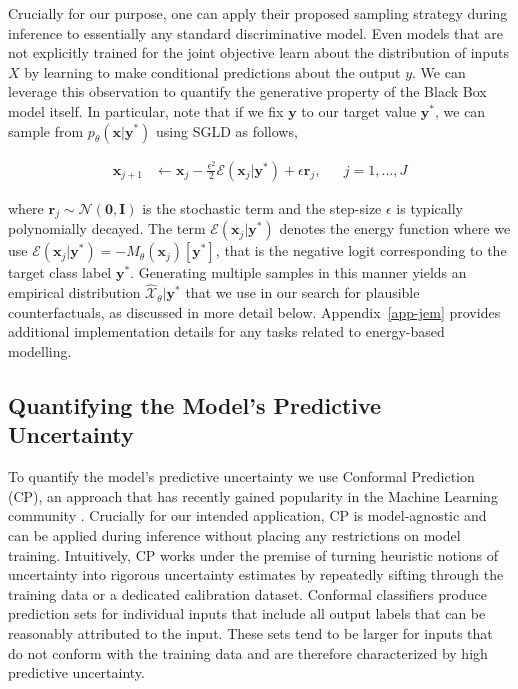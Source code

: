 \documentclass{article}
\begin{document}
Crucially for our purpose, one can apply their proposed sampling strategy during inference to essentially any standard discriminative model. Even models that are not explicitly trained for the joint objective learn about the distribution of inputs $X$ by learning to make conditional predictions about the output $y$. We can leverage this observation to quantify the generative property of the Black Box model itself. In particular, note that if we fix $\mathbf{y}$ to our target value $\mathbf{y}^*$, we can sample from $p_{\theta}(\mathbf{x}|\mathbf{y}^*)$ using SGLD as follows, 

\begin{equation}\label{eq:sgld}
  \begin{aligned}
    \mathbf{x}_{j+1} &\leftarrow \mathbf{x}_j - \frac{\epsilon^2}{2} \mathcal{E}(\mathbf{x}_j|\mathbf{y}^*) + \epsilon \mathbf{r}_j, && j=1,...,J
  \end{aligned}
\end{equation}

where $\mathbf{r}_j \sim \mathcal{N}(\mathbf{0},\mathbf{I})$ is the stochastic term and the step-size $\epsilon$ is typically polynomially decayed. The term $\mathcal{E}(\mathbf{x}_j|\mathbf{y}^*)$ denotes the energy function where we use $\mathcal{E}(\mathbf{x}_j|\mathbf{y}^*)=-M_{\theta}(\mathbf{x}_j)[\mathbf{y}^*]$, that is the negative logit corresponding to the target class label $\mathbf{y}^*$. Generating multiple samples in this manner yields an empirical distribution $\hat{\mathcal{X}}_{\theta}|\mathbf{y}^*$ that we use in our search for plausible counterfactuals, as discussed in more detail below. Appendix~\ref{app-jem} provides additional implementation details for any tasks related to energy-based modelling. 

\subsection{Quantifying the Model's Predictive Uncertainty}

To quantify the model's predictive uncertainty we use Conformal Prediction (CP), an approach that has recently gained popularity in the Machine Learning community \citep{angelopoulos2021gentle,manokhin2022awesome}. Crucially for our intended application, CP is model-agnostic and can be applied during inference without placing any restrictions on model training. Intuitively, CP works under the premise of turning heuristic notions of uncertainty into rigorous uncertainty estimates by repeatedly sifting through the training data or a dedicated calibration dataset. Conformal classifiers produce prediction sets for individual inputs that include all output labels that can be reasonably attributed to the input. These sets tend to be larger for inputs that do not conform with the training data and are therefore characterized by high predictive uncertainty. 
\end{document}
